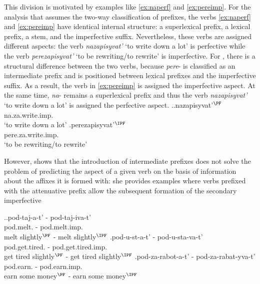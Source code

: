 This division is motivated by examples like \ref{ex:naperf} and \ref{ex:pereimp}. For the analysis that assumes the two-way classification of prefixes, the verbs \ref{ex:naperf} and \ref{ex:pereimp} have identical internal structure: a superlexical prefix, a lexical prefix, a stem, and the imperfective suffix. Nevertheless, these verbs are assigned different aspects: the verb \textit{nazapisyvat'} `to write down a lot' is perfective while the verb \textit{perezapisyvat'} `to be rewriting/to rewrite' is imperfective. For \citet{Tatevosov:07}, there is a structural difference between the two verbs, because \textit{pere}- is classified as an intermediate prefix and is positioned between lexical prefixes and the imperfective suffix. As a result, the verb in \ref{ex:pereimp} is assigned the imperfective aspect. At the same time, \textit{na}- remains a superlexical prefix and thus the verb \textit{nazapisyvat'} `to write down a lot' is assigned the perfective aspect.
\ex.\ag.\label{ex:naperf}nazapisyvat'$^{\PF}$\\
na.za.write.imp.\\
`to write down a lot'
\bg.\label{ex:pereimp}perezapisyvat'$^{\IPF}$\\
pere.za.write.imp.\\
`to be rewriting/to rewrite'

However, \cite{Kagan:book} shows that the introduction of intermediate prefixes does not solve the problem of predicting the aspect of a given verb on the basis of information about the affixes it is formed with: she provides examples where verbs prefixed with the attenuative prefix  allow the subsequent formation of the secondary imperfective \citep[35, ex.~\ref{ex:pod} here]{Kagan:book}

\ex.\label{ex:pod}\ag.pod-taj-a-t' - pod-taj-iva-t'\\
pod.melt. - pod.melt.imp.\\
melt slightly$^{\PF}$ - melt slightly$^{\IPF}$
\bg.\label{ex:podustavat'}pod-u-st-a-t' - pod-u-sta-va-t'\\
pod.get.tired. - pod.get.tired.imp.\\
get tired slightly$^{\PF}$ - get tired slightly$^{\IPF}$
\bg.\label{ex:podzarabatyvat'}pod-za-rabot-a-t' - pod-za-rabat-yva-t'\\
pod.earn. - pod.earn.imp.\\
earn some money$^{\PF}$ - earn some money$^{\IPF}$

